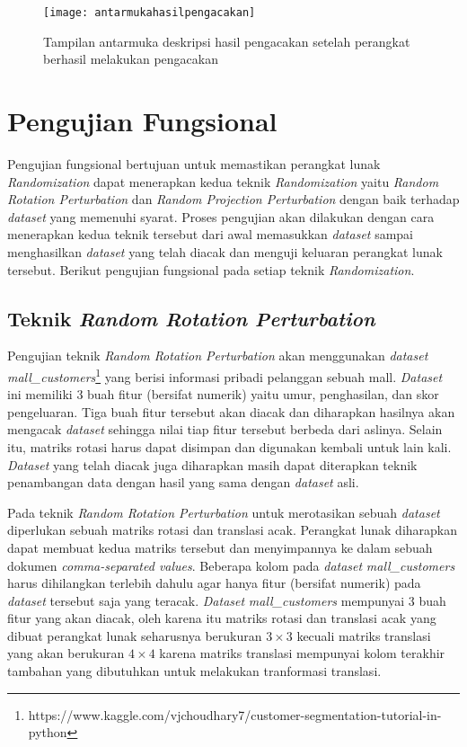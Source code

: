 \begin{figure}
	\centering
	\texttt{[image: antarmukahasilpengacakan]}
	\caption{Tampilan antarmuka deskripsi hasil pengacakan setelah perangkat berhasil melakukan pengacakan}
	\label{fig:antarmukahasilpengacakan}
\end{figure}

\section{Pengujian Fungsional}
\label{sec:pengujianfungsional}

Pengujian fungsional bertujuan untuk memastikan perangkat lunak \textit{Randomization} dapat menerapkan kedua teknik \textit{Randomization} yaitu \textit{Random Rotation Perturbation} dan \textit{Random Projection Perturbation} dengan baik terhadap \textit{dataset} yang memenuhi syarat. Proses pengujian akan dilakukan dengan cara menerapkan kedua teknik tersebut dari awal memasukkan \textit{dataset} sampai menghasilkan \textit{dataset} yang telah diacak dan menguji keluaran perangkat lunak tersebut. Berikut pengujian fungsional pada setiap teknik \textit{Randomization}.

\subsection{Teknik \textit{Random Rotation Perturbation}}
\label{subsec:rrp-fungsional}

Pengujian teknik \textit{Random Rotation Perturbation} akan menggunakan \textit{dataset} \textit{mall\_customers}\footnote{https://www.kaggle.com/vjchoudhary7/customer-segmentation-tutorial-in-python} yang berisi informasi pribadi pelanggan sebuah mall. \textit{Dataset} ini memiliki 3 buah fitur (bersifat numerik) yaitu umur, penghasilan, dan skor pengeluaran. Tiga buah fitur tersebut akan diacak dan diharapkan hasilnya akan mengacak \textit{dataset} sehingga nilai tiap fitur tersebut berbeda dari aslinya. Selain itu, matriks rotasi harus dapat disimpan dan digunakan kembali untuk lain kali. \textit{Dataset} yang telah diacak juga diharapkan masih dapat diterapkan teknik penambangan data dengan hasil yang sama dengan \textit{dataset} asli.

Pada teknik \textit{Random Rotation Perturbation} untuk merotasikan sebuah \textit{dataset} diperlukan sebuah matriks rotasi dan translasi acak. Perangkat lunak diharapkan dapat membuat kedua matriks tersebut dan menyimpannya ke dalam sebuah dokumen \textit{comma-separated values}. Beberapa kolom pada \textit{dataset} \textit{mall\_customers} harus dihilangkan terlebih dahulu agar hanya fitur (bersifat numerik) pada \textit{dataset} tersebut saja yang teracak. \textit{Dataset} \textit{mall\_customers} mempunyai 3 buah fitur yang akan diacak, oleh karena itu matriks rotasi dan translasi acak yang dibuat perangkat lunak seharusnya berukuran \(3\times3\) kecuali matriks translasi yang akan berukuran \(4\times4\) karena matriks translasi mempunyai kolom terakhir tambahan yang dibutuhkan untuk melakukan tranformasi translasi. 

